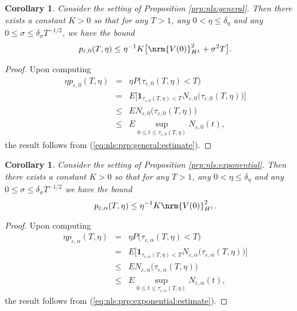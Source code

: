 \documentclass[10pt]{articleHJ}
\newcommand{\e}{\ensuremath{\varepsilon}}
\renewcommand{\a}{\ensuremath{\alpha}}
\DeclarePairedDelimiter{\nrm}\lVert\rVert
\newcommand{\sref}[1]{(\ref{#1})}                       %
\newtheorem{cor}[thm]{Corollary}
\numberwithin{equation}{section}
\begin{document}
\begin{cor}
\label{cor:nls:general}
Consider the setting of
Proposition \ref{prp:nls:general}.
Then there exists a constant $K > 0$
so that for any $T > 1$,
any $0 < \eta \le \delta_{\eta}$
and any $0 \le \sigma \le \delta_{\sigma} T^{-1/2}$,
we have the bound
\begin{equation}
p_{\e,0}(T,\eta)\leq \eta^{-1} K \big[ \nrm{V(0)}_{H^1}^2+ \sigma^2 T \big] .
\end{equation}
\end{cor}
\begin{proof}
Upon computing
\begin{equation}
\begin{array}{lcl}
\eta p_{\e,0}(T,\eta)
& = & \eta P\big( \tau_{\e,0}(T, \eta) < T\big)
\\[0.2cm]
& = & E \Big[
      \mathbf{1}_{\tau_{\e,0}(T, \eta) < T}
      N_{\e,0}\big(\tau_{\e,0}(T, \eta)\big)
    \Big]
\\[0.2cm]
& \le & E N_{\e,0}\big( \tau_{\e,0}(T, \eta)  \big)
\\[0.2cm]
& \le & E \sup_{0 \le t \le \tau_{\e,0}(T, \eta) } N_{\e,0 } (t)
,
\end{array}
\end{equation}
the result follows from
\sref{eq:nls:prp:general:estimate}.
\end{proof}



\begin{cor}
\label{cor:nls:exponential}
Consider the setting of
Proposition \ref{prp:nls:exponential}.
Then there exists a constant $K > 0$
so that for any $T > 1$,
any $0 < \eta \le \delta_{\eta}$
and any $0 \le \sigma \le \delta_{\sigma} T^{-1/2}$
we have the bound
\begin{equation}
p_{\e,\alpha}(T,\eta)\leq \eta^{-1} K \nrm{V(0)}_{H^1}^2.
\end{equation}
\end{cor}
\begin{proof}
Upon computing
\begin{equation}
\begin{array}{lcl}
\eta p_{\e,\alpha}(T,\eta)
& = & \eta P\big( \tau_{\e,\alpha}(T, \eta) < T\big)
\\[0.2cm]
& = & E \Big[
      \mathbf{1}_{\tau_{\e,\alpha}(T, \eta) < T}
      N_{\e,\a}\big(\tau_{\e,\alpha}(T, \eta) \big)
    \Big]
\\[0.2cm]
& \le & E N_{\e,\a}\big(\tau_{\e,\alpha}(T, \eta)  \big)
\\[0.2cm]
& \le & E \sup_{0 \le t \le \tau_{\e,\a}(T, \eta)}
   N_{\e,\a}(t)
,
\end{array}
\end{equation}
the result follows from
\sref{eq:nls:prp:exponential:estimate}.
\end{proof}
\end{document}
